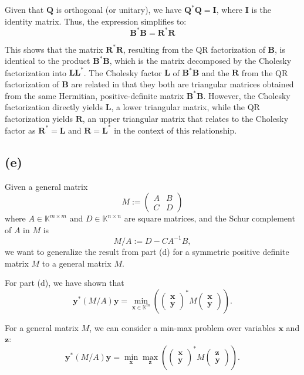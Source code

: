 \documentclass{article}
\begin{document}
Given that $\boldsymbol{Q}$ is orthogonal (or unitary), we have $\boldsymbol{Q}^* \boldsymbol{Q}=\boldsymbol{I}$, where $\boldsymbol{I}$ is the identity matrix. Thus, the expression simplifies to:
$$
\boldsymbol{B}^* \boldsymbol{B}=\boldsymbol{R}^* \boldsymbol{R}
$$

This shows that the matrix $\boldsymbol{R}^* \boldsymbol{R}$, resulting from the QR factorization of $\boldsymbol{B}$, is identical to the product $\boldsymbol{B}^* \boldsymbol{B}$, which is the matrix decomposed by the Cholesky factorization into $\boldsymbol{L} \boldsymbol{L}^*$.
The Cholesky factor $\boldsymbol{L}$ of $\boldsymbol{B}^* \boldsymbol{B}$ and the $\boldsymbol{R}$ from the QR factorization of $\boldsymbol{B}$ are related in that they both are triangular matrices obtained from the same Hermitian, positive-definite matrix $\boldsymbol{B}^* \boldsymbol{B}$. However, the Cholesky factorization directly yields $\boldsymbol{L}$, a lower triangular matrix, while the QR factorization yields $\boldsymbol{R}$, an upper triangular matrix that relates to the Cholesky factor as $\boldsymbol{R}^*=\boldsymbol{L}$ and $\boldsymbol{R}=\boldsymbol{L}^*$ in the context of this relationship.
\subsection{(e)}

Given a general matrix 
\[ M := \begin{pmatrix} A & B \\ C & D \end{pmatrix} \]
where \( A \in \mathbb{K}^{m \times m} \) and \( D \in \mathbb{K}^{n \times n} \) are square matrices, and the Schur complement of \( A \) in \( M \) is 
\[ M/A := D - CA^{-1}B, \]
we want to generalize the result from part (d) for a symmetric positive definite matrix \( M \) to a general matrix \( M \).

For part (d), we have shown that
\[ \boldsymbol{y}^*(M/A)\boldsymbol{y} = \min_{\boldsymbol{x} \in \mathbb{K}^m} \left(\begin{pmatrix} \boldsymbol{x} \\ \boldsymbol{y} \end{pmatrix}^* M \begin{pmatrix} \boldsymbol{x} \\ \boldsymbol{y} \end{pmatrix}\right). \]

For a general matrix \( M \), we can consider a min-max problem over variables \( \boldsymbol{x} \) and \( \boldsymbol{z} \):
\[ \boldsymbol{y}^*(M/A)\boldsymbol{y} = \min_{\boldsymbol{x}} \max_{\boldsymbol{z}} \left(\begin{pmatrix} \boldsymbol{x} \\ \boldsymbol{y} \end{pmatrix}^* M \begin{pmatrix} \boldsymbol{z} \\ \boldsymbol{y} \end{pmatrix}\right). \]
\end{document}
